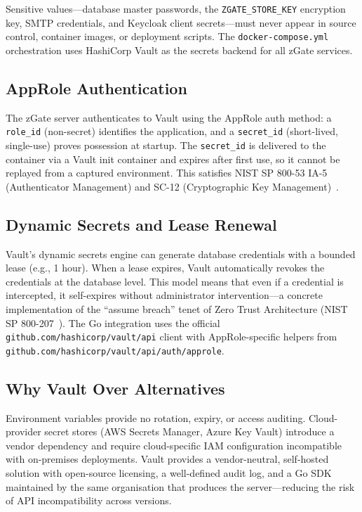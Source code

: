 Sensitive values---database master passwords, the \texttt{ZGATE\_STORE\_KEY} encryption key, SMTP credentials, and Keycloak client secrets---must never appear in source control, container images, or deployment scripts. The \texttt{docker-compose.yml} orchestration uses HashiCorp Vault as the secrets backend for all zGate services.

\subsection{AppRole Authentication}

The zGate server authenticates to Vault using the AppRole auth method: a \texttt{role\_id} (non-secret) identifies the application, and a \texttt{secret\_id} (short-lived, single-use) proves possession at startup. The \texttt{secret\_id} is delivered to the container via a Vault init container and expires after first use, so it cannot be replayed from a captured environment. This satisfies NIST SP 800-53 IA-5 (Authenticator Management) and SC-12 (Cryptographic Key Management)~\cite{nist-controls}.

\subsection{Dynamic Secrets and Lease Renewal}

Vault's dynamic secrets engine can generate database credentials with a bounded lease (e.g., 1 hour). When a lease expires, Vault automatically revokes the credentials at the database level. This model means that even if a credential is intercepted, it self-expires without administrator intervention---a concrete implementation of the ``assume breach'' tenet of Zero Trust Architecture (NIST SP 800-207~\cite{nist-zt}). The Go integration uses the official \texttt{github.com/hashicorp/vault/api} client with AppRole-specific helpers from \texttt{github.com/hashicorp/vault/api/auth/approle}.

\subsection{Why Vault Over Alternatives}

Environment variables provide no rotation, expiry, or access auditing. Cloud-provider secret stores (AWS Secrets Manager, Azure Key Vault) introduce a vendor dependency and require cloud-specific IAM configuration incompatible with on-premises deployments. Vault provides a vendor-neutral, self-hosted solution with open-source licensing, a well-defined audit log, and a Go SDK maintained by the same organisation that produces the server---reducing the risk of API incompatibility across versions.

